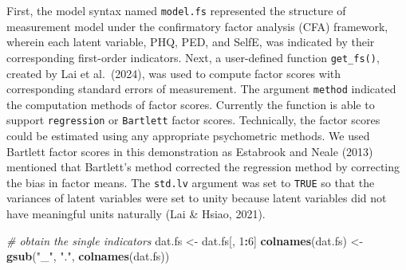\documentclass[
  man]{apa7}
\newenvironment{Shaded}{\begin{snugshade}}{\end{snugshade}}
\newcommand{\CommentTok}[1]{\textcolor[rgb]{0.56,0.35,0.01}{\textit{#1}}}
\newcommand{\DecValTok}[1]{\textcolor[rgb]{0.00,0.00,0.81}{#1}}
\newcommand{\FunctionTok}[1]{\textcolor[rgb]{0.13,0.29,0.53}{\textbf{#1}}}
\newcommand{\NormalTok}[1]{#1}
\newcommand{\OtherTok}[1]{\textcolor[rgb]{0.56,0.35,0.01}{#1}}
\newcommand{\SpecialCharTok}[1]{\textcolor[rgb]{0.81,0.36,0.00}{\textbf{#1}}}
\newcommand{\StringTok}[1]{\textcolor[rgb]{0.31,0.60,0.02}{#1}}
\begin{document}
\normalsize
First, the model syntax named \texttt{model.fs} represented the structure of measurement model under the confirmatory factor analysis (CFA) framework, wherein each latent variable, PHQ, PED, and SelfE, was indicated by their corresponding first-order indicators. Next, a user-defined function \texttt{get\_fs()}, created by Lai et al.~(2024), was used to compute factor scores with corresponding standard errors of measurement. The argument \texttt{method} indicated the computation methods of factor scores. Currently the function is able to support \texttt{regression} or \texttt{Bartlett} factor scores. Technically, the factor scores could be estimated using any appropriate psychometric methods. We used Bartlett factor scores in this demonstration as Estabrook and Neale (2013) mentioned that Bartlett's method corrected the regression method by correcting the bias in factor means. The \texttt{std.lv} argument was set to \texttt{TRUE} so that the variances of latent variables were set to unity because latent variables did not have meaningful units naturally (Lai \& Hsiao, 2021).

\footnotesize

\begin{Shaded}
\begin{Highlighting}[]
\CommentTok{\# obtain the single indicators}
\NormalTok{dat.fs }\OtherTok{\textless{}{-}}\NormalTok{ dat.fs[, }\DecValTok{1}\SpecialCharTok{:}\DecValTok{6}\NormalTok{]}
\FunctionTok{colnames}\NormalTok{(dat.fs) }\OtherTok{\textless{}{-}} \FunctionTok{gsub}\NormalTok{(}\StringTok{"\_"}\NormalTok{, }\StringTok{"."}\NormalTok{, }\FunctionTok{colnames}\NormalTok{(dat.fs))}
\end{Highlighting}
\end{Shaded}

\normalsize

\footnotesize
\end{document}
